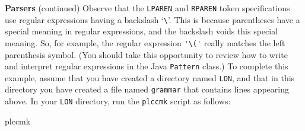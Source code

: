 \begin{minipage}[t]{\sw}
\slidenumber
\LARGE
{\bf Parsers} (continued)\exx
\emm{\Large\LightBox{\MYlonGrammar}}\exx
Observe that the \verb'LPAREN' and \verb'RPAREN' token specifications
use regular expressions having a backslash `\verb'\''.
This is because parentheses have a special meaning in regular expressions,
and the backslash voids this special meaning.
So, for example, the regular expression \verb.'\('.
really matches the left parenthesis symbol.
(You should take this opportunity
to review how to write and interpret regular expressions
in the Java \verb'Pattern' class.)\exx
To complete this example, 
assume that you have created a directory named \verb'LON',
and that in this directory you have created a file named \verb'grammar'
that contains lines appearing above.
In your \verb'LON' directory,
run the \verb'plccmk' script as follows:
\begin{qv}
plccmk
\end{qv}
\end{minipage}
\clearpage
